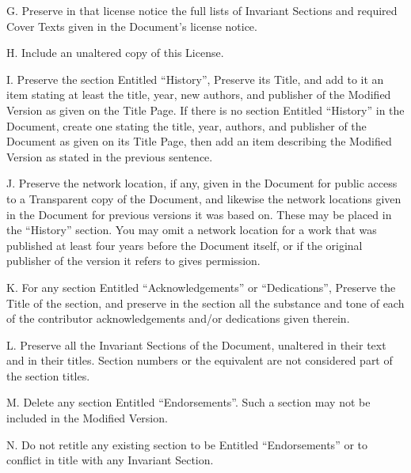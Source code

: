 {\tiny{}G. Preserve in that license notice the full lists of Invariant
Sections and required Cover Texts given in the Document's license
notice.}{\tiny\par}

{\tiny{}H. Include an unaltered copy of this License.}{\tiny\par}

{\tiny{}I. Preserve the section Entitled \textsf{``}History\textsf{''}, Preserve its
Title, and add to it an item stating at least the title, year, new
authors, and publisher of the Modified Version as given on the Title
Page. If there is no section Entitled \textquotedblleft History\textquotedblright{}
in the Document, create one stating the title, year, authors, and
publisher of the Document as given on its Title Page, then add an
item describing the Modified Version as stated in the previous sentence.}{\tiny\par}

{\tiny{}J. Preserve the network location, if any, given in the Document
for public access to a Transparent copy of the Document, and likewise
the network locations given in the Document for previous versions
it was based on. These may be placed in the \textsf{``}History\textsf{''} section.
You may omit a network location for a work that was published at least
four years before the Document itself, or if the original publisher
of the version it refers to gives permission.}{\tiny\par}

{\tiny{}K. For any section Entitled \textsf{``}Acknowledgements\textsf{''} or \textsf{``}Dedications\textsf{''},
Preserve the Title of the section, and preserve in the section all
the substance and tone of each of the contributor acknowledgements
and/or dedications given therein.}{\tiny\par}

{\tiny{}L. Preserve all the Invariant Sections of the Document, unaltered
in their text and in their titles. Section numbers or the equivalent
are not considered part of the section titles.}{\tiny\par}

{\tiny{}M. Delete any section Entitled \textsf{``}Endorsements\textsf{''}. Such a
section may not be included in the Modified Version.}{\tiny\par}

{\tiny{}N. Do not retitle any existing section to be Entitled \textsf{``}Endorsements\textsf{''}
or to conflict in title with any Invariant Section.}{\tiny\par}

